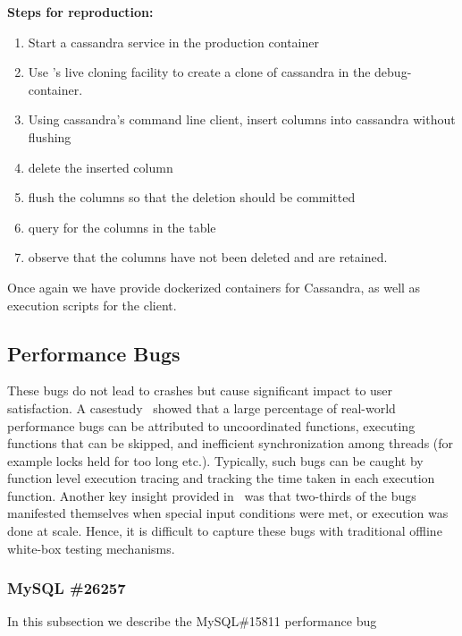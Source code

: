 \noindent \textbf{Steps for reproduction:} \\

\begin{adjustwidth}{0.5cm}{}
	\begin{enumerate}
		\item Start a cassandra service in the production container
		\item Use \parikshan's live cloning facility to create a clone of cassandra in the debug-container.
		\item Using cassandra's command line client, insert columns into cassandra without flushing
		\item delete the inserted column
		\item flush the columns so that the deletion should be committed
		\item query for the columns in the table
		\item observe that the columns have not been deleted and are retained.
	\end{enumerate}
\end{adjustwidth}

Once again we have provide dockerized containers for Cassandra, as well as execution scripts for the client.

\subsection{Performance Bugs}

These bugs do not lead to crashes but cause significant impact to user satisfaction.
A casestudy~\cite{shanluPerf} showed that a large percentage of real-world performance bugs can be attributed to uncoordinated functions, executing functions that can be skipped, and inefficient synchronization among threads (for example locks held for too long etc.).
Typically, such bugs can be caught by function level execution tracing and tracking the time taken in each execution function.
Another key insight provided in~\cite{shanluPerf} was that two-thirds of the bugs manifested themselves when special input conditions were met, or execution was done at scale. 
Hence, it is difficult to capture these bugs with traditional offline white-box testing mechanisms.


\subsubsection{MySQL \#26257}

In this subsection we describe the MySQL\#15811 performance bug \\

